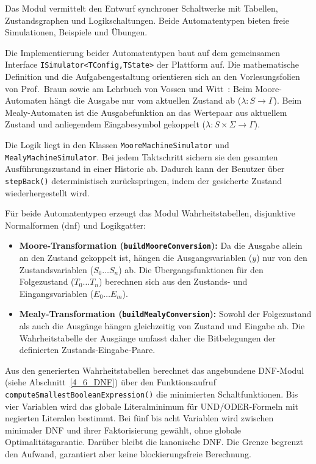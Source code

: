  \label{4_5_MM}

Das Modul vermittelt den Entwurf synchroner Schaltwerke mit Tabellen, Zustandsgraphen und Logikschaltungen. Beide Automatentypen bieten freie Simulationen, Beispiele und Übungen.


Die Implementierung beider Automatentypen baut auf dem gemeinsamen Interface \texttt{ISimulator\allowbreak<TConfig,\allowbreak{}TState>} der Plattform auf. Die mathematische Definition und die Aufgabengestaltung orientieren sich an den Vorlesungsfolien von Prof.~Braun sowie am Lehrbuch von Vossen und Witt~\cite[Kapitel~4]{vossen2000}: Beim Moore-Automaten hängt die Ausgabe nur vom aktuellen Zustand ab ($\lambda: S \to \Gamma$). Beim Mealy-Automaten ist die Ausgabefunktion an das Wertepaar aus aktuellem Zustand und anliegendem Eingabesymbol gekoppelt ($\lambda: S \times \Sigma \to \Gamma$).

Die Logik liegt in den Klassen \verb|MooreMachineSimulator| und \verb|MealyMachineSimulator|. Bei jedem Taktschritt sichern sie den gesamten Ausführungszustand in einer Historie ab. Dadurch kann der Benutzer über \verb|stepBack()| deterministisch zurückspringen, indem der gesicherte Zustand wiederhergestellt wird.

Für beide Automatentypen erzeugt das Modul Wahrheitstabellen, disjunktive Normalformen (\gls{dnf}) und Logikgatter:
\begin{itemize}
  \item \textbf{Moore-Transformation (\texttt{buildMooreConversion}):} Da die Ausgabe allein an den Zustand gekoppelt ist, hängen die Ausgangsvariablen ($y$) nur von den Zustandsvariablen ($S_0 \dots S_n$) ab. Die Übergangsfunktionen für den Folgezustand ($T_0 \dots T_n$) berechnen sich aus den Zustands- und Eingangsvariablen ($E_0 \dots E_m$).
  \item \textbf{Mealy-Transformation (\texttt{buildMealyConversion}):} Sowohl der Folgezustand als auch die Ausgänge hängen gleichzeitig von Zustand und Eingabe ab. Die Wahrheitstabelle der Ausgänge umfasst daher die Bitbelegungen der definierten Zustands-Eingabe-Paare.
\end{itemize}
Aus den generierten Wahrheitstabellen berechnet das angebundene DNF-Modul (siehe Abschnitt~\ref{4_6_DNF}) über den Funktionsaufruf \texttt{compute\-Smallest\-Boolean\-Expression()} die minimierten Schaltfunktionen. Bis vier Variablen wird das globale Literalminimum für UND/ODER-Formeln mit negierten Literalen bestimmt. Bei fünf bis acht Variablen wird zwischen minimaler DNF und ihrer Faktorisierung gewählt, ohne globale Optimalitätsgarantie. Darüber bleibt die kanonische DNF. Die Grenze begrenzt den Aufwand, garantiert aber keine blockierungsfreie Berechnung.

